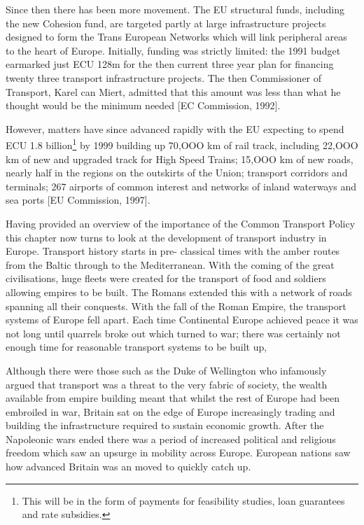 Since then there has been more movement. The EU structural funds, including the new Cohesion fund, are targeted partly at large infrastructure projects designed to form the Trans European Networks which will link peripheral areas to the heart of Europe. Initially, funding was strictly limited: the 1991 budget earmarked just ECU 128m for the then current three year plan for financing twenty three transport infrastructure projects. The then Commissioner of Transport, Karel can Miert, admitted that this amount was less than what he thought would be the minimum needed [EC Commission, 1992].

However, matters have since advanced rapidly with the EU expecting to spend ECU 1.8 billion\footnote{This will be in the form of payments for feasibility studies, loan guarantees and rate subsidies.} by 1999 building up 70,OOO km of rail track, including 22,OOO km of new and upgraded track for High Speed Trains; 15,OOO km of new roads, nearly half in the regions on the outskirts of the Union; transport corridors and terminals; 267 airports of common interest and networks of inland waterways and sea ports [EU Commission, 1997].

Having provided an overview of the importance of the Common Transport Policy this chapter now turns to look at the development of transport industry in Europe. Transport history starts in pre- classical times with the amber routes from the Baltic through to the Mediterranean. With the coming of the great civilisations, huge fleets were created for the transport of food and soldiers allowing empires to be built. The Romans extended this with a network of roads spanning all their conquests. With the fall of the Roman Empire, the transport systems of Europe fell apart. Each time Continental Europe achieved peace it was not long until quarrels broke out which turned to war; there was certainly not enough time for reasonable transport systems to be built up,

Although there were those such as the Duke of Wellington who infamously argued that transport was a threat to the very fabric of society, the wealth available from empire building meant that whilst the rest of Europe had been embroiled in war, Britain sat on the edge of Europe increasingly trading and building the infrastructure required to sustain economic growth. After the Napoleonic wars ended there was a period of increased political and religious freedom which saw an upsurge in mobility across Europe. European nations saw how advanced Britain was an moved to quickly catch up.

